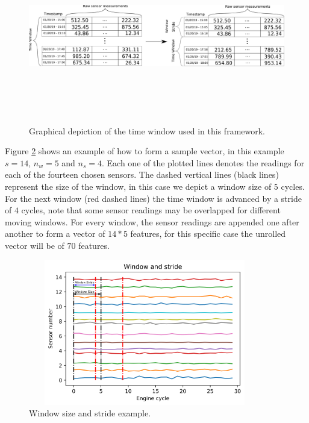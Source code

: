\documentclass[preprint,12pt]{elsarticle}%
\begin{document}
\begin{figure}[!htb]
\begin{center}
\includegraphics[width=6in, height=3in,]
{Figures/time_window2.png}
\caption{Graphical depiction of the time window used in this framework.}
\label{fig:moving_window}
\end{center}
\end{figure}

Figure \ref{fig:window_stride_arrows} shows an example of how to form a sample vector, in this example $s=14$, $n_w=5$ and $n_s=4$. Each one of the plotted lines denotes the readings for each of the fourteen chosen sensors. The dashed vertical lines (black lines) represent the size of the window, in this case we depict a window size of $5$ cycles. For the next window (red dashed lines) the time window is advanced by a stride of $4$ cycles, note that some sensor readings may be overlapped for different moving windows. For every window, the sensor readings are appended one after another to form a vector of $14*5$ features, for this specific case the unrolled vector will be of $70$ features.

\begin{figure}[!htb]
\begin{center}
\includegraphics[width=4in, height=2.5in]
{Figures/window_stride_arrows.png}
\caption{Window size and stride example.}
\label{fig:window_stride_arrows}
\end{center}
\end{figure}
\end{document}
